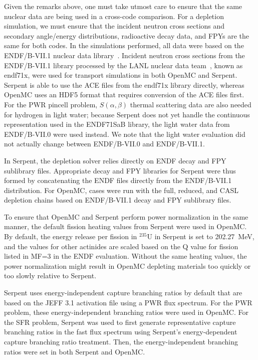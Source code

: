 \documentclass[3p,authoryear]{elsarticle}
\begin{document}
Given the remarks above, one must take utmost care to ensure that the same
nuclear data are being used in a cross-code comparison. For a depletion
simulation, we must ensure that the incident neutron cross sections and
secondary angle/energy distributions, radioactive decay data, and FPYs are the
same for both codes. In the simulations performed, all data were based on the
ENDF/B-VII.1 nuclear data library~\citep{chadwick2011nds}. Incident neutron
cross sections from the ENDF/B-VII.1 library processed by the LANL nuclear data
team~\citep{conlin2013lanl}, known as endf71x, were used for transport
simulations in both OpenMC and Serpent. Serpent is able to use the ACE files
from the endf71x library directly, whereas OpenMC uses an HDF5 format that
requires conversion of the ACE files first. For the PWR pincell problem,
$S(\alpha,\beta)$ thermal scattering data are also needed for hydrogen in light
water; because Serpent does not yet handle the continuous representation used in
the ENDF71SaB library, the light water data from ENDF/B-VII.0 were used instead.
We note that the light water evaluation did not actually change between
ENDF/B-VII.0 and ENDF/B-VII.1.

In Serpent, the depletion solver relies directly on ENDF decay and FPY
sublibrary files. Appropriate decay and FPY libraries for Serpent were thus
formed by concatenating the ENDF files directly from the ENDF/B-VII.1
distribution. For OpenMC, cases were run with the full, reduced, and CASL
depletion chains based on ENDF/B-VII.1 decay and FPY sublibrary files.

To ensure that OpenMC and Serpent perform power normalization in the same
manner, the default fission heating values from Serpent were used in OpenMC. By
default, the energy release per fission in $^{235}$U in Serpent is set to
\SI{202.27}{\mega\electronvolt}, and the values for other actinides are scaled
based on the Q value for fission listed in MF=3 in the ENDF evaluation. Without
the same heating values, the power normalization might result in OpenMC
depleting materials too quickly or too slowly relative to Serpent.

Serpent uses energy-independent capture branching ratios by default that are
based on the JEFF 3.1 activation file using a PWR flux spectrum. For the PWR
problem, these energy-independent branching ratios were used in OpenMC. For the
SFR problem, Serpent was used to first generate representative capture branching
ratios in the fast flux spectrum using Serpent's energy-dependent capture
branching ratio treatment. Then, the energy-independent branching ratios were
set in both Serpent and OpenMC.
\end{document}
